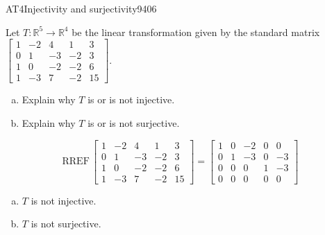 \begin{exercise}{AT4}{Injectivity and surjectivity}{9406} 
\begin{exerciseStatement} 

 Let \(T:\mathbb{R}^5 \to \mathbb{R}^4\) be the linear transformation given by the standard matrix \(\left[\begin{array}{ccccc}
1 & -2 & 4 & 1 & 3 \\
0 & 1 & -3 & -2 & 3 \\
1 & 0 & -2 & -2 & 6 \\
1 & -3 & 7 & -2 & 15
\end{array}\right]\). 

 

\begin{enumerate}[(a)]
\item 

Explain why \(T\) is or is not injective.


\item 

Explain why \(T\) is or is not surjective.


\end{enumerate}

     \end{exerciseStatement}
 \begin{exerciseAnswer} 

\[\mathrm{RREF}\,\left[\begin{array}{ccccc}
1 & -2 & 4 & 1 & 3 \\
0 & 1 & -3 & -2 & 3 \\
1 & 0 & -2 & -2 & 6 \\
1 & -3 & 7 & -2 & 15
\end{array}\right]=\left[\begin{array}{ccccc}
1 & 0 & -2 & 0 & 0 \\
0 & 1 & -3 & 0 & -3 \\
0 & 0 & 0 & 1 & -3 \\
0 & 0 & 0 & 0 & 0
\end{array}\right]\]

 

\begin{enumerate}[(a)]
\item  

\(T\) is not injective.

 
\item  

\(T\) is not surjective.

 
\end{enumerate}

     \end{exerciseAnswer}
 \end{exercise}


